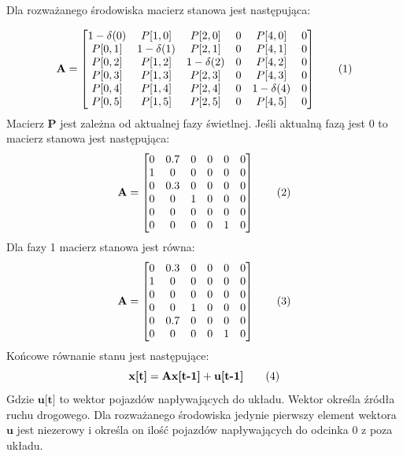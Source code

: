 \documentclass[12pt]{book}
\theoremstyle{plain}
\newcommand\addtag{\refstepcounter{equation}
	\renewcommand{\labelenumii}{\theenumii}
	\renewcommand{\theenumii}{\theenumi.\arabic{enumii}.}
	\tag{\theequation}}
\begin{document}
Dla rozważanego środowiska macierz stanowa jest następująca:
\def \AStart {\begin{bmatrix}
		1-\delta(0) & P[1,0]      & P[2,0]      & 0 & P[4,0]      & 0 \\
		P[0,1]      & 1-\delta(1) & P[2,1]      & 0 & P[4,1]      & 0 \\
		P[0,2]      & P[1,2]      & 1-\delta(2) & 0 & P[4,2]      & 0 \\
		P[0,3]      & P[1,3]      & P[2,3]      & 0 & P[4,3]      & 0 \\
		P[0,4]      & P[1,4]      & P[2,4]      & 0 & 1-\delta(4) & 0 \\
		P[0,5]      & P[1,5]      & P[2,5]      & 0 & P[4,5]      & 0 \\
\end{bmatrix}}

\def \AFazaZero {\begin{bmatrix}
		0 & 0.7   & 0 & 0 & 0 & 0 \\
		1 & 0 &     0 & 0 & 0 & 0 \\
		0 & 0.3   & 0 & 0 & 0 & 0 \\
		0 & 0 &     1 & 0 & 0 & 0 \\
		0 & 0 &     0 & 0 & 0 & 0 \\
		0 & 0 &     0 & 0 & 1 & 0 
\end{bmatrix}}

\def \AFazaI {\begin{bmatrix}
		0 & 0.3 & 0 & 0 & 0 & 0 \\
		1 & 0 &   0 & 0 & 0 & 0 \\
		0 & 0 &   0 & 0 & 0 & 0 \\
		0 & 0 &   1 & 0 & 0 & 0 \\
		0 & 0.7 & 0 & 0 & 0 & 0 \\
		0 & 0   & 0 & 0 & 1 & 0 
\end{bmatrix}}

\[\textbf{A}= \AStart \addtag \]
Macierz $\textbf{P}$ jest zależna od aktualnej fazy świetlnej. Jeśli aktualną fazą jest 0 to macierz stanowa jest następująca:
\[\textbf{A}=\AFazaZero \addtag \]
Dla fazy 1 macierz stanowa jest równa:
\[\textbf{A}= \AFazaI \addtag \]
Końcowe równanie stanu jest następujące:
\[
\textbf{x[t]}=\textbf{Ax[t-1]}+\textbf{u[t-1]} \addtag
\]
Gdzie $\textbf{u[t]}$ to wektor pojazdów napływających do układu. Wektor określa źródła ruchu drogowego. Dla rozważanego środowiska jedynie pierwszy element wektora $\textbf{u}$ jest niezerowy i określa on ilość pojazdów napływających do odcinka 0 z poza układu.
\end{document}
